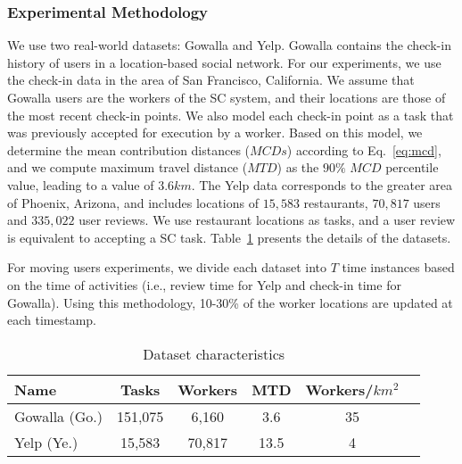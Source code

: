 \documentclass{USC-Thesis}
\newcommand{\tn}{\tabularnewline}
\numberwithin{equation}{chapter}
\begin{document}
\subsubsection{Experimental Methodology}
\label{sec:experimental_setup}
We use two real-world datasets: Gowalla and Yelp. Gowalla contains the check-in history of users in a location-based social network. For our experiments, we use the check-in data in the area of San Francisco, California. We assume that Gowalla users are the workers of the SC system, and their locations are those of the most recent check-in points. We also model each check-in point as a task that was previously accepted for execution by a worker. Based on this model, we determine the mean contribution distances ($\mathit{MCDs}$) according to Eq.~\eqref{eq:mcd}, and we compute maximum travel distance ($\mathit{MTD}$) as the $90\%$ $MCD$ percentile value, leading to a value of $3.6km$. 
The Yelp data corresponds to the greater area of Phoenix, Arizona, and includes locations of $15,583$ restaurants, $70,817$ users and $335,022$ user reviews. We use restaurant locations as tasks, and a user review is equivalent to accepting a SC task.
Table~\ref{tab:real_datasets} presents the details of the datasets.

For moving users experiments, we divide each dataset into $T$ time instances based on the time of activities (i.e., review time for Yelp and check-in time for Gowalla). Using this methodology, 10-30\% of the worker locations are updated at each timestamp.

\begin{table}
\begin{center}
\footnotesize
\begin{tabular}{ l | c |  c | c | c | r}
\hline
\textbf{Name} & \textbf{Tasks} & \textbf{Workers} & \textbf{MTD} & \textbf{Workers/$km^2$} \tn
\hline
Gowalla (Go.) & 151,075 & 6,160 & 3.6 & 35   \tn
\hline
Yelp (Ye.) & 15,583 & 70,817 & 13.5 & 4  \tn
\hline
\end{tabular}
\caption{Dataset characteristics}
\label{tab:real_datasets}
\end{center}
\end{table}
\end{document}

